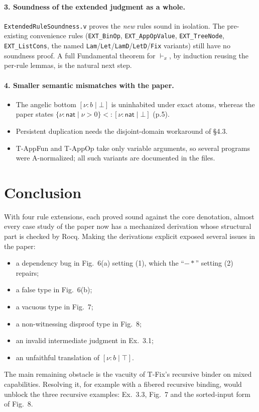 \documentclass[10pt]{article}
\newcommand{\ov}[2]{\{\nu{:}#1 \mid #2\}}          %
\newcommand{\un}[2]{[\nu{:}#1 \mid #2]}            %
\newcommand{\Nat}{\mathsf{nat}}
\newcommand{\wand}{\mathrel{-\!\!*}}
\newcommand{\vd}{\vdash_{\!x}}
\newcommand{\sub}{\mathrel{<:}}
\newcommand{\rocq}[1]{\texttt{#1}}
\begin{document}
\paragraph{3. Soundness of the extended judgment as a whole.}
\rocq{ExtendedRuleSoundness.v} proves the \emph{new} rules sound in isolation.
The pre-existing convenience rules (\rocq{EXT\_BinOp}, \rocq{EXT\_AppOpValue},
\rocq{EXT\_TreeNode}, \rocq{EXT\_ListCons}, the named
\rocq{Lam}/\rocq{Let}/\rocq{LamD}/\rocq{LetD}/\rocq{Fix} variants) still have no
soundness proof. A full Fundamental theorem for $\vd$, by induction reusing
the per-rule lemmas, is the natural next step.

\paragraph{4. Smaller semantic mismatches with the paper.}
\begin{itemize}
\item The angelic bottom $\un{b}{\bot}$ is uninhabited under exact atoms,
  whereas the paper states $\ov{\Nat}{\nu>0}\sub\un{\Nat}{\bot}$ (p.5).
\item Persistent duplication needs the disjoint-domain workaround of \S4.3.
\item T-AppFun and T-AppOp take only variable arguments, so several programs
  were A-normalized; all such variants are documented in the files.
\end{itemize}

\section{Conclusion}

With four rule extensions, each proved sound against the core denotation,
almost every case study of the paper now has a mechanized derivation whose
structural part is checked by Rocq. Making the derivations explicit exposed
several issues in the paper:
\begin{itemize}
\item a dependency bug in Fig.~6(a) setting (1), which the ``$\wand$'' setting
  (2) repairs;
\item a false type in Fig.~6(b);
\item a vacuous type in Fig.~7;
\item a non-witnessing disproof type in Fig.~8;
\item an invalid intermediate judgment in Ex.~3.1;
\item an unfaithful translation of $\un{b}{\top}$.
\end{itemize}
The main remaining obstacle is the vacuity of T-Fix's recursive binder on
mixed capabilities. Resolving it, for example with a fibered recursive
binding, would unblock the three recursive examples: Ex.~3.3, Fig.~7 and the
sorted-input form of Fig.~8.
\end{document}

